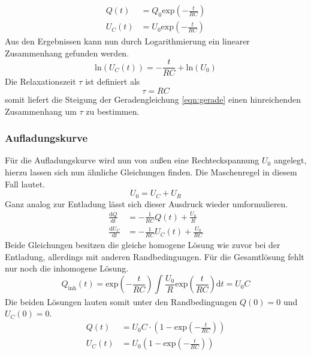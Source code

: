 \begin{align}
    Q(t) &= Q_{0}\text{exp}\left(- \frac{t}{RC}\right) \\
    U_{C}(t) &= U_{0} \text{exp}\left(- \frac{t}{RC}\right)
\end{align}
Aus den Ergebnissen kann nun durch Logarithmierung ein linearer Zusammenhang gefunden werden.
\begin{equation}
    \label{eqn:gerade}
\text{ln}(U_{C}(t)) = -\frac{t}{RC} + \text{ln}(U_{0})
\end{equation}
Die Relaxationszeit $\tau$ ist definiert als
\begin{equation}
\tau = RC
\end{equation}
somit liefert die Steigung der Geradengleichung \eqref{eqn:gerade} einen hinreichenden Zusammenhang um $\tau$ zu bestimmen.
\subsubsection{Aufladungskurve}
Für die Aufladungskurve wird nun von außen eine Rechteckspannung $U_{0}$ angelegt, hierzu lassen sich nun ähnliche Gleichungen finden.
Die Maschenregel in diesem Fall lautet.
\begin{equation}
    \label{eqn:masche2}
    U_{0} = U_{C} + U_{R}
\end{equation}
Ganz analog zur Entladung lässt sich dieser Ausdruck wieder umformulieren.
\begin{align}
    \frac{\text{d}Q}{\text{d}t} &= - \frac{1}{RC} Q(t) + \frac{U_{0}}{R} \\
    \frac{\text{d}U_{C}}{\text{d}t} &= - \frac{1}{RC} U_{C}(t) + \frac{U_{0}}{RC}
\end{align}
Beide Gleichungen besitzen die gleiche homogene Lösung wie zuvor bei der Entladung, allerdings mit anderen Randbedingungen. Für die Gesamtlösung fehlt nur noch die inhomogene Lösung.
\begin{equation}
Q_{\text{inh}}(t) = \text{exp}\left( - \frac{t}{RC}\right) \int_{}^{} \frac{U_{0}}{R} \text{exp}\left(\frac{t}{RC}\right) \text{d}t = U_{0}C
\end{equation}
Die beiden Lösungen lauten somit unter den Randbedingungen $Q(0) = 0$ und $U_{C}(0)= 0$.
\begin{align}
    Q(t) &= U_{0}C \cdot \left( 1 - \text{exp}\left(- \frac{t}{RC}\right) \right)\\
    U_{C}(t) &= U_{0} \left( 1 - \text{exp}\left(- \frac{t}{RC}\right)\right)
\end{align}
